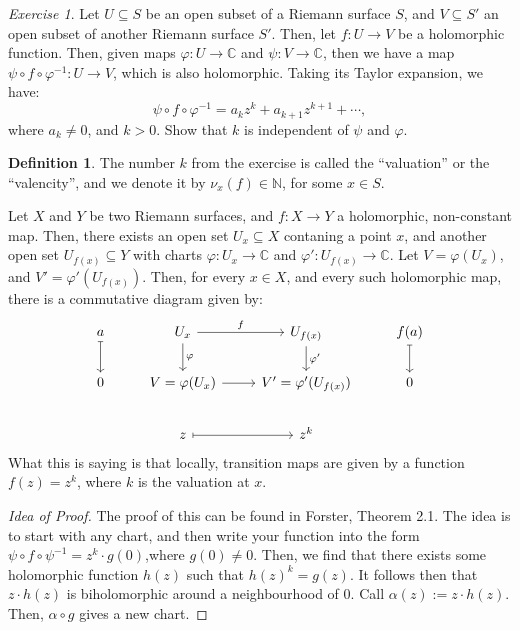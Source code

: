 \documentclass[a4paper]{report}
\theoremstyle{definition}
\newtheorem{definition}{Definition}
\theoremstyle{remark}
\theoremstyle{proposition}
\theoremstyle{conjecture}
\theoremstyle{lemma}
\theoremstyle{corollary}
\theoremstyle{exercise}
\newtheorem{exercise}{Exercise}
\theoremstyle{example}
\newcommand{\C}{\mathbb{C}}
\begin{document}
 \begin{exercise}
    Let $U\subseteq S$ be an open subset of a Riemann surface $S$, and $V\subseteq S'$ an open subset of another Riemann surface $S'$. 
    Then, let $f : U\to V$ be a holomorphic function. 
    Then, given maps $\varphi : U \to \C$ and $\psi : V \to \C$,
    then we have a map $\psi \circ f \circ \varphi^{-1} : U \to V$,
    which is also holomorphic. Taking its Taylor expansion, we have:
    $$\psi \circ f \circ \varphi^{-1} = a_kz^k + a_{k+1}z^{k+1} + \cdots,$$
    where $a_k \neq 0$, and $k > 0$.  Show that $k$ is independent of $\psi$ and $\varphi$.
 \end{exercise}

 \begin{definition}
     The number $k$ from the exercise is called the ``valuation'' or the ``valencity'', and we denote it by $\nu_x(f) \in \mathbb{N}$, for some $x \in S$. 
 \end{definition}

\begin{theorem}
    Let $X$ and $Y$ be two Riemann surfaces, and $f: X \to Y$ a holomorphic, 
    non-constant map. Then, there exists an open set $U_x\subseteq X$ contaning
    a point $x$, and another open set $U_{f(x)} \subseteq Y$ 
    with charts $\varphi : U_x \to \C$ and $\varphi' :U_{f(x)} \to \C$. 
    Let $V = \varphi(U_x)$, and $V' = \varphi'(U_{f(x)})$. Then, for 
    every $x \in X$, and every such holomorphic map, there is a commutative 
    diagram given by:
    $$
    \begin{tikzcd}
a \arrow[d, maps to] & U_x \arrow[r, "f"] \arrow[d, "\varphi"] & U_{f(x)} \arrow[d, "\varphi'"] & f(a) \arrow[d, maps to] \\
0                    & V=\varphi(U_x) \arrow[r]                & V'=\varphi'(U_{f(x)})          & 0                       \\
                     & z \arrow[r, maps to]                    & z^k                            &
\end{tikzcd}
$$
What this is saying is that locally, transition maps are given by a 
function $f(z) = z^k$, where $k$ is the valuation at $x$. 
\end{theorem}

\begin{proof}[Idea of Proof]
    The proof of this can be found in Forster, Theorem 2.1.
    The idea is to start with any chart, and then write your function
    into the form $\psi \circ f\circ \psi^{-1} = z^k\cdot g(0)$,where 
    $g(0) \neq 0$. Then, we find that there exists some holomorphic function
    $h(z)$ such that $h(z)^k = g(z)$. It follows then that 
    $z\cdot h(z)$ is biholomorphic around a neighbourhood of $0$. 
    Call $\alpha(z) := z\cdot h(z)$. Then, $\alpha \circ g$ gives a 
    new chart. 
\end{proof}
\end{document}
